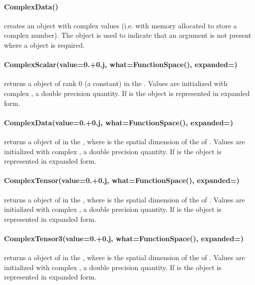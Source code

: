\paragraph{ComplexData()}
creates an \EmptyData object with complex values (i.e. with memory allocated to
store a complex number). The \EmptyData object is used to indicate that
an argument is not present where a \Data object is required.


\paragraph{ComplexScalar(value=0.+0.j, what=FunctionSpace(), expanded=\False)}
returns a \Data object of rank 0 (a constant) in the \FunctionSpace {}.
Values are initialized with complex , a double precision quantity.
If  is \True the \Data object is represented in expanded form.


\paragraph{ComplexData(value=0.+0.j, what=FunctionSpace(), expanded=\False)}
returns a \Data object of \Shape {} in the \FunctionSpace {},
where  is the spatial dimension of the \Domain of .
Values are initialized with complex , a double precision quantity.
If  is \True the \Data object is represented in expanded form.


\paragraph{ComplexTensor(value=0.+0.j, what=FunctionSpace(), expanded=\False)}
returns a \Data object of \Shape {} in the \FunctionSpace {},
where  is the spatial dimension of the \Domain of .
Values are initialized with complex , a double precision quantity.
If  is \True the \Data object is represented in expanded form.


\paragraph{ComplexTensor3(value=0.+0.j, what=FunctionSpace(), expanded=\False)}
returns a \Data object of \Shape {} in the \FunctionSpace {},
where  is the spatial dimension of the \Domain of .
Values are initialized with complex , a double precision quantity.
If  is \True the \Data object is represented in expanded form.



